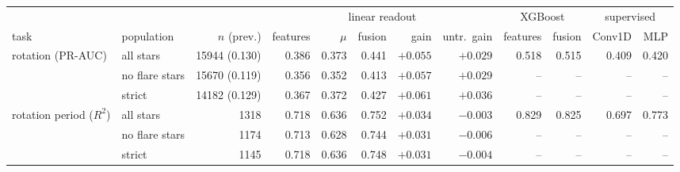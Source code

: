 \setlength{\tabcolsep}{2.5pt}
\begin{tabular}{llrrrrrrrrrr}
\toprule
 & & & \multicolumn{5}{c}{linear readout} & \multicolumn{2}{c}{XGBoost} & \multicolumn{2}{c}{supervised} \\
\cmidrule(lr){4-8}\cmidrule(lr){9-10}\cmidrule(lr){11-12}
task & population & $n$ (prev.) & features & $\mu$ & fusion & gain & untr.\ gain & features & fusion & Conv1D & MLP \\
\midrule
rotation (PR-AUC) & all stars & 15944 (0.130) & 0.386 & 0.373 & 0.441 & $\mathbf{+0.055}$ & $+0.029$ & 0.518 & 0.515 & 0.409 & 0.420 \\
 & \quad no flare stars & 15670 (0.119) & 0.356 & 0.352 & 0.413 & $\mathbf{+0.057}$ & $+0.029$ & -- & -- & -- & -- \\
 & \quad strict & 14182 (0.129) & 0.367 & 0.372 & 0.427 & $\mathbf{+0.061}$ & $+0.036$ & -- & -- & -- & -- \\
\midrule
rotation period ($R^2$) & all stars & 1318 & 0.718 & 0.636 & 0.752 & $\mathbf{+0.034}$ & $-0.003$ & 0.829 & 0.825 & 0.697 & 0.773 \\
 & \quad no flare stars & 1174 & 0.713 & 0.628 & 0.744 & $\mathbf{+0.031}$ & $-0.006$ & -- & -- & -- & -- \\
 & \quad strict & 1145 & 0.718 & 0.636 & 0.748 & $\mathbf{+0.031}$ & $-0.004$ & -- & -- & -- & -- \\
\bottomrule
\end{tabular}
